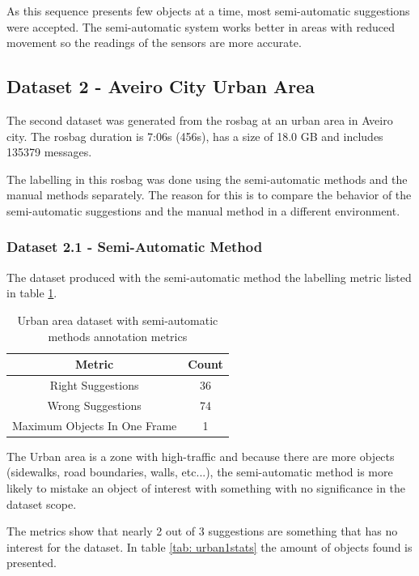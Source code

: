 As this sequence presents few objects at a time, most semi-automatic suggestions were accepted. The semi-automatic system works better in areas with reduced movement so the readings of the sensors are more accurate.

\subsection{Dataset 2 - Aveiro City Urban Area}

The second dataset was generated from the rosbag at an urban area in Aveiro city. The rosbag duration is 7:06s (456s), has a size of 18.0 GB and includes 135379 messages. 

The labelling in this rosbag was done using the semi-automatic methods and the manual methods separately. The reason for this is to compare the behavior of the semi-automatic suggestions and the manual method in a different environment.

\subsubsection{Dataset 2.1 - Semi-Automatic Method}

The dataset produced with the semi-automatic method the labelling metric listed in table \ref{tab: urban1metrics}.

\begin{table}[]
	\centering
	\caption{Urban area dataset with semi-automatic methods annotation metrics}
	\label{tab: urban1metrics}
	\begin{tabular}{c|c}
		\textbf{Metric}              & \textbf{Count} \\ \hline
		Right Suggestions            & 36                      \\ \hline
		Wrong Suggestions            & 74                      \\ \hline
		Maximum Objects In One Frame & 1                      
	\end{tabular}
\end{table}

The Urban area is a zone with high-traffic and because there are more objects (sidewalks, road boundaries, walls, etc...), the semi-automatic method is more likely to mistake an object of interest with something with no significance in the dataset scope. 

The metrics show that nearly 2 out of 3 suggestions are something that has no interest for the dataset. In table \ref{tab: urban1stats} the amount of objects found is presented.

